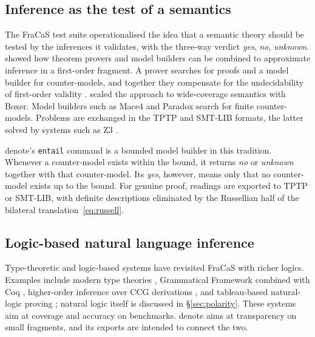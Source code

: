 \documentclass[11pt,a4paper]{article}
\newcommand{\dn}{\textsf{denote}}
\theoremstyle{definition}
\begin{document}
\subsection{Inference as the test of a semantics}
The FraCaS test suite \citep{cooperetal1996} operationalised the idea that a semantic theory should be tested by the inferences it validates, with the three-way verdict \emph{yes}, \emph{no}, \emph{unknown}. \citet{blackburnbos2005} showed how theorem provers and model builders can be combined to approximate inference in a first-order fragment. A prover searches for proofs and a model builder for counter-models, and together they compensate for the undecidability of first-order validity \citep{church1936note}. \citet{bos2008} scaled the approach to wide-coverage semantics with Boxer. Model builders such as Mace4 \citep{mccune2010} and Paradox \citep{claessensorensson2003} search for finite counter-models. Problems are exchanged in the TPTP \citep{sutcliffe2009} and SMT-LIB \citep{barrettetal2010} formats, the latter solved by systems such as Z3 \citep{demourabjorner2008}.

\dn{}'s \texttt{entail} command is a bounded model builder in this tradition. Whenever a counter-model exists within the bound, it returns \emph{no} or \emph{unknown} together with that counter-model. Its \emph{yes}, however, means only that no counter-model exists up to the bound. For genuine proof, readings are exported to TPTP or SMT-LIB, with definite descriptions eliminated by the Russellian half of the bilateral translation~\eqref{eq:russell}.

\subsection{Logic-based natural language inference}
Type-theoretic and logic-based systems have revisited FraCaS with richer logics. Examples include modern type theories \citep{chatzikyriakidisluo2020}, Grammatical Framework combined with Coq \citep{bernardychatzi2017}, higher-order inference over CCG derivations \citep{mineshimaetal2015}, and tableau-based natural-logic proving \citep{abzianidze2017}; natural logic itself is discussed in \S\ref{sec:polarity}. These systems aim at coverage and accuracy on benchmarks. \dn{} aims at transparency on small fragments, and its exports are intended to connect the two.
\end{document}
